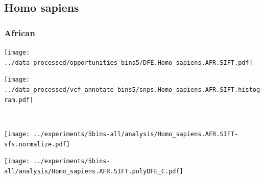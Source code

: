 \subsection{Homo sapiens}

\subsubsection{African}

\begin{minipage}{0.49\linewidth}
    \texttt{[image: ../data\_processed/opportunities\_bins5/DFE.Homo\_sapiens.AFR.SIFT.pdf]}
\end{minipage}
\begin{minipage}{0.49\linewidth}
    \texttt{[image: ../data\_processed/vcf\_annotate\_bins5/snps.Homo\_sapiens.AFR.SIFT.histogram.pdf]}
\end{minipage}
\\
\begin{minipage}{0.49\linewidth}
    \texttt{[image: ../experiments/5bins-all/analysis/Homo\_sapiens.AFR.SIFT-sfs.normalize.pdf]}
\end{minipage}
\begin{minipage}{0.4\linewidth}
    \texttt{[image: ../experiments/5bins-all/analysis/Homo\_sapiens.AFR.SIFT.polyDFE\_C.pdf]}
\end{minipage}
